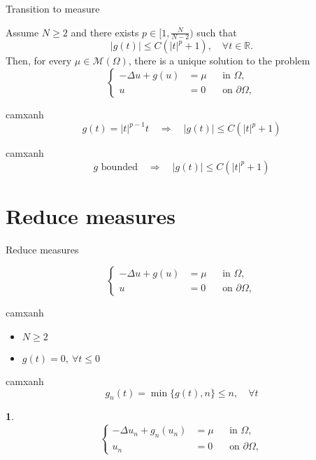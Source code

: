 \documentclass{beamer}
\begin{document}
\begin{frame}{Transition to measure}
\begin{theorem}
Assume $N \ge 2$ and there exists $p \in [1, \frac{N}{N-2})$ such that
\[
|g(t)| \le C(|t|^p + 1), \quad\forall t\in \mathbb{R}.
\]
Then, for every $\mu\in \mathcal{M}(\Omega)$, there is a unique solution to the problem
\[
\left\{
\begin{aligned}
-\Delta u + g(u) & = \mu && \text{in } \Omega , \\
u & = 0 && \text{on } \partial \Omega ,
\end{aligned}
\right.
\]
\end{theorem}
\medskip
\begin{beamercolorbox}{camxanh}
\[
g(t) = |t|^{p-1}t \quad \Rightarrow \quad |g(t)| \le C(|t|^p + 1)
\]
\end{beamercolorbox}
\begin{beamercolorbox}{camxanh}
\[
g \text{ bounded} \quad \Rightarrow \quad |g(t)| \le C(|t|^p + 1)
\]
\end{beamercolorbox}
\end{frame}

\section{Reduce measures}

\begin{frame}{Reduce measures}
\begin{pro}
\[
\left\{
\begin{aligned}
-\Delta u + g(u) & = \mu && \text{in } \Omega , \\
u & = 0 && \text{on } \partial \Omega ,
\end{aligned}
\right.
\]
\end{pro}
\begin{beamercolorbox}{camxanh}
\begin{itemize}
\item $N \geq 2$
\item $g(t) = 0,\ \forall t \leq 0$
\end{itemize}
\end{beamercolorbox}
\medskip
\begin{beamercolorbox}{camxanh}
\[
g_n(t) = \min \{g(t), n \}\leq n,\quad\forall t
\]
\end{beamercolorbox}
\newtheorem*{thm}{}
\begin{thm}
\[
\left\{
\begin{aligned}
-\Delta u_n + g_n(u_n) & = \mu && \text{in } \Omega , \\
u_n & = 0 && \text{on } \partial \Omega ,
\end{aligned}
\right.
\]
\end{thm}
\end{frame}
\end{document}
